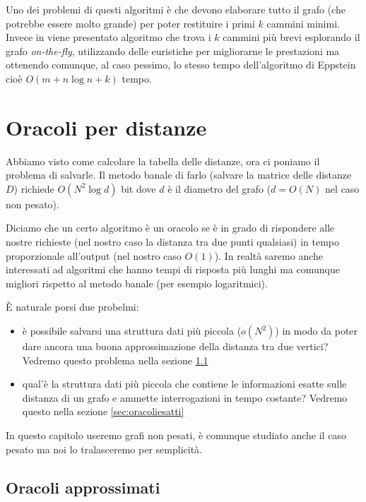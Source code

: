 \documentclass[a4paper,10pt]{amsbook}
\theoremstyle{plain}
\theoremstyle{definition}
\theoremstyle{remark}
\newcommand{\pa}[1]{\left(#1\right)}
\begin{document}
Uno dei problemi di questi algoritmi è che devono elaborare tutto il
grafo (che potrebbe essere molto grande) per poter restituire i primi
$k$ cammini minimi. Invece in \cite{kspheur} viene presentato
algoritmo che trova i $k$ cammini più brevi esplorando il grafo
\textit{on-the-fly}, utilizzando delle euristiche per migliorarne le
prestazioni ma ottenendo comunque, al caso pessimo, lo stesso tempo
dell'algoritmo di Eppstein cioè $O\pa{m + n\log n + k}$ tempo.

\chapter{Oracoli per distanze}

Abbiamo visto come calcolare la tabella delle distanze, ora ci poniamo
il problema di salvarle. Il metodo banale di farlo (salvare la matrice
delle distanze $D$) richiede $O\pa{ N^2 \log d}$ bit dove $d$ è il
diametro del grafo ($d = O\pa{N}$ nel caso non pesato).

Diciamo che un certo algoritmo \`e un oracolo se \`e in grado di
rispondere alle nostre richieste (nel nostro caso la distanza tra due
punti qualsiasi) in tempo proporzionale all'output (nel nostro caso
$O\pa{1}$). In realt\`a saremo anche interessati ad algoritmi che
hanno tempi di risposta pi\`u lunghi ma comunque migliori rispetto al
metodo banale (per esempio logaritmici).

\`E naturale porsi due probelmi:
\begin{itemize}
\item è possibile salvarsi una struttura dati pi\`u piccola ($o
  \pa{ N^2}$) in modo da poter dare ancora una buona approssimazione
  della distanza tra due vertici? Vedremo questo problema nella
  sezione \ref{sec:oracoliapprossimati}
\item qual'\`e la struttura dati pi\`u piccola che contiene le
  informazioni esatte sulle distanza di un grafo e ammette
  interrogazioni in tempo costante? Vedremo questo nella
  sezione \ref{sec:oracoliesatti}
\end{itemize}

In questo capitolo useremo grafi non pesati, \`e comunque studiato
anche il caso pesato ma noi lo tralasceremo per semplicit\`a.

\section{Oracoli approssimati}
\label{sec:oracoliapprossimati}
\end{document}
